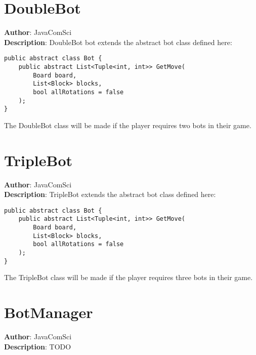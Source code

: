 \documentclass[12pt]{article}
\begin{document}
\section{DoubleBot}
\textbf{Author}: JavaComSci \\
\textbf{Description}: DoubleBot bot extends the abstract bot class defined here: 
\begin{verbatim}
public abstract class Bot {
    public abstract List<Tuple<int, int>> GetMove(
        Board board, 
        List<Block> blocks, 
        bool allRotations = false
    );
}
\end{verbatim}
 The DoubleBot class will be made if the player requires two bots in their game. \\



\section{TripleBot}
\textbf{Author}: JavaComSci \\
\textbf{Description}: TripleBot extends the abstract bot class defined here: 
\begin{verbatim}
public abstract class Bot {
    public abstract List<Tuple<int, int>> GetMove(
        Board board, 
        List<Block> blocks, 
        bool allRotations = false
    );
}
\end{verbatim}
 The TripleBot class will be made if the player requires three bots in their game. \\



\section{BotManager}
\textbf{Author}: JavaComSci \\
\textbf{Description}: TODO \\
\end{document}
